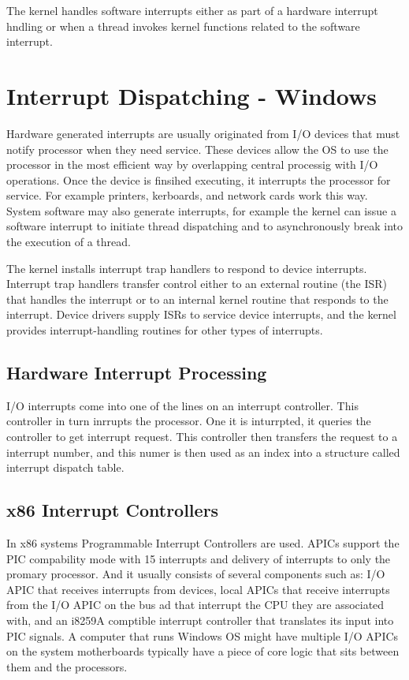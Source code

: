 \documentclass[letterpaper,10pt,draftclsnofoot,onecolumn]{IEEEtran}
\begin{document}
The kernel handles software interrupts either as part of a hardware interrupt hndling or when a thread invokes kernel functions related to the software interrupt.

\section*{Interrupt Dispatching - Windows}

Hardware generated interrupts are usually originated from I/O devices that must notify processor when they need service. These devices allow the OS to use the processor in the most efficient way by overlapping central processig with I/O operations. Once the device is finsihed executing, it interrupts the processor for service. For example printers, kerboards, and network cards work this way. System software may also generate interrupts, for example the kernel can issue a software interrupt to initiate thread dispatching and to asynchronously break into the execution of a thread.

The kernel installs interrupt trap handlers to respond to device interrupts. Interrupt trap handlers transfer control either to an external routine (the ISR) that handles the interrupt or to an internal kernel routine that responds to the interrupt. Device drivers supply ISRs to service device interrupts, and the kernel provides interrupt-handling routines for other types of interrupts.\cite{[1]}

\subsection*{Hardware Interrupt Processing}

I/O interrupts come into one of the lines on an interrupt controller. This controller in turn inrrupts the processor. One it is inturrpted, it queries the controller to get interrupt request. This controller then transfers the request to a interrupt number, and this numer is then used as an index into a structure called interrupt dispatch table. 

\subsection*{x86 Interrupt Controllers}

In x86 systems Programmable Interrupt Controllers are used. APICs support the PIC compability mode with 15 interrupts and delivery of interrupts to only the promary processor. And it usually consists of several components such as: I/O APIC that receives interrupts from devices, local APICs that receive interrupts from the I/O APIC on the bus ad that interrupt the CPU they are associated with, and an i8259A comptible interrupt controller that translates its input into PIC signals. A computer that runs Windows OS might have multiple I/O APICs on the system motherboards typically have a piece of core logic that sits between them and the processors. 
\end{document}
